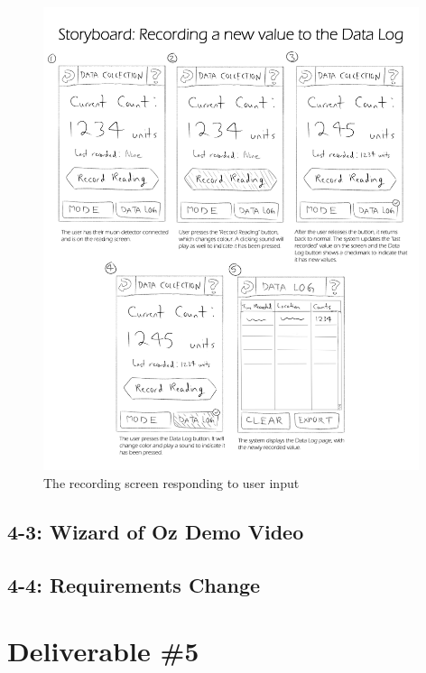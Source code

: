 \documentclass[11pt,a4paper]{article}
\begin{document}
\bigskip
\begin{figure}[h]
  \centering
      \includegraphics[width=0.98\textwidth]{storyboard.png}
  \caption{The recording screen responding to user input}
\end{figure}
\subsection*{4-3: Wizard of Oz Demo Video}
\subsection*{4-4: Requirements Change}
\section*{Deliverable \#5}
\end{document}
